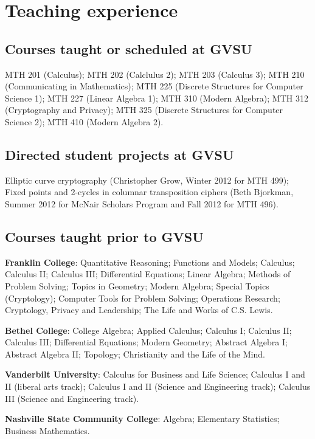 \documentclass[letterpaper]{article}
\renewenvironment{itemize}{
  \begin{list}{}{
    \setlength{\leftmargin}{1.5em}
	\setlength{\itemsep}{0in}
  }
}{
  \end{list}
}
\begin{document}
\section*{Teaching experience}

\subsection*{Courses taught or scheduled at GVSU}
MTH 201 (Calculus); MTH 202 (Calclulus 2); MTH 203 (Calculus 3); MTH 210 (Communicating in Mathematics); MTH 225 (Discrete Structures for Computer Science 1); MTH 227 (Linear Algebra 1); MTH 310 (Modern Algebra); MTH 312 (Cryptography and Privacy); MTH 325 (Discrete Structures for Computer Science 2); MTH 410 (Modern Algebra 2).


\subsection*{Directed student projects at GVSU}
Elliptic curve cryptography (Christopher Grow, Winter 2012 for MTH 499); Fixed points and 2-cycles in columnar transposition ciphers (Beth Bjorkman, Summer 2012 for McNair Scholars Program and Fall 2012 for MTH 496).

\subsection*{Courses taught prior to GVSU}

\begin{itemize}
	\item \textbf{Franklin College}: Quantitative Reasoning; Functions and Models; Calculus; Calculus II; Calculus III; Differential Equations; Linear Algebra; Methods of Problem Solving; Topics in Geometry; Modern Algebra; Special Topics (Cryptology); Computer Tools for Problem Solving; Operations Research; Cryptology, Privacy and Leadership; The Life and Works of C.S. Lewis.
	\item \textbf{Bethel College}: College Algebra; Applied Calculus; Calculus I; Calculus II; Calculus III; Differential Equations; Modern Geometry; Abstract Algebra I; Abstract Algebra II; Topology; Christianity and the Life of the Mind.
	\item \textbf{Vanderbilt University}: Calculus for Business and Life Science; Calculus I and II (liberal arts track); Calculus I and II (Science and Engineering track); Calculus III (Science and Engineering track).
	\item \textbf{Nashville State Community College}: Algebra; Elementary Statistics; Business Mathematics.
\end{itemize}
\end{document}
